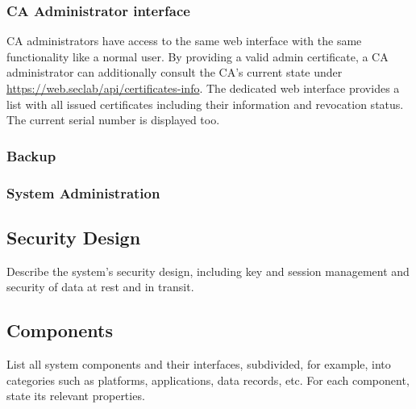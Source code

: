 \documentclass[english]{article}
\begin{document}
 \subsubsection{CA Administrator interface}
 CA administrators have access to the same web interface with the same functionality like a normal user.
 By providing a valid admin certificate, a CA administrator can additionally consult the CA's current state under \url{https://web.seclab/api/certificates-info}. The dedicated web interface provides a list with all issued certificates including their information and revocation status. The current serial number is displayed too.
 
\subsubsection{Backup} 
 
 \subsubsection{System Administration}
 
 
 

\subsection{Security Design}

Describe the system's security design, including key and session management and 
security of data at rest and in transit.


\subsection{Components} \label{components}

List all system components and their interfaces, subdivided, for example, into
  categories such as platforms, applications, data records, etc. For
  each component, state its relevant properties.
  
  
\end{document}
